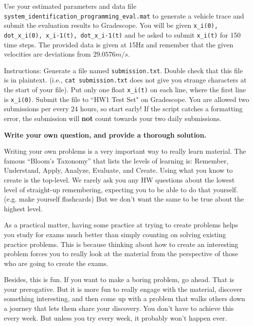 \documentclass[11pt]{article}
\begin{document}
\begin{Parts}
		
		
		\Part Use your estimated parameters and data file \texttt{system\_identification\_programming\_eval.mat} to generate a vehicle trace and submit the evaluation results to Gradescope. You will be given \texttt{x\_i(0), dot\_x\_i(0), x\_i-1(t), dot\_x\_i-1(t)} and be asked to submit \texttt{x\_i(t)} for 150 time steps. The provided data is given at 15Hz and remember that the given velocities are deviations from $29.0576 m/s$.

		Instructions: Generate a file named \texttt{submission.txt}. Double check that this file is in plaintext. (i.e., \texttt{cat submission.txt} does not give you strange characters at the start of your file). Put only one float \texttt{x\_i(t)} on each line, where the first line is \texttt{x\_i(0)}. Submit the file to ``HW1 Test Set" on Gradescope. You are allowed two submissions per every 24 hours, so start early! If the script catches a formatting error, the submission will \textbf{not} count towards your two daily submissions.
		
		

\end{Parts}


{\bf Write your own question, and provide a thorough solution.}

Writing your own problems is a very important way to really learn
material. The famous ``Bloom's Taxonomy'' that lists the levels of
learning is: Remember, Understand, Apply, Analyze, Evaluate, and
Create. Using what you know to create is the top-level. We rarely ask
you any HW questions about the lowest level of straight-up
remembering, expecting you to be able to do that yourself. (e.g. make
yourself flashcards) But we don't want the same to be true about the
highest level.

As a practical matter, having some practice at trying to create
problems helps you study for exams much better than simply counting on
solving existing practice problems. This is because thinking about how
to create an interesting problem forces you to really look at the
material from the perspective of those who are going to create the
exams. 

Besides, this is fun. If you want to make a boring problem, go
ahead. That is your prerogative. But it is more fun to really engage
with the material, discover something interesting, and then come up
with a problem that walks others down a journey that lets them share
your discovery. You don't have to achieve this every week. But unless
you try every week, it probably won't happen ever. 
\end{document}
